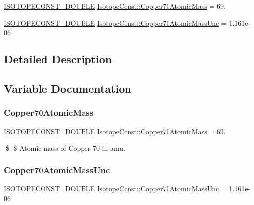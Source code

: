 \begin{DoxyCompactItemize}
\item 
\mbox{\hyperlink{group___isotope_const-_macros_ga8f45a7272ce02c0b4c65c44636ed719a}{I\+S\+O\+T\+O\+P\+E\+C\+O\+N\+S\+T\+\_\+\+D\+O\+U\+B\+LE}} \mbox{\hyperlink{group___isotope_const-_copper-_cu70_ga4dbd45afa2504af0aa63e2fa0423e0e4}{Isotope\+Const\+::\+Copper70\+Atomic\+Mass}} = 69.
\item 
\mbox{\hyperlink{group___isotope_const-_macros_ga8f45a7272ce02c0b4c65c44636ed719a}{I\+S\+O\+T\+O\+P\+E\+C\+O\+N\+S\+T\+\_\+\+D\+O\+U\+B\+LE}} \mbox{\hyperlink{group___isotope_const-_copper-_cu70_gaf562cc7680d7601bb07f87e8ff3b6524}{Isotope\+Const\+::\+Copper70\+Atomic\+Mass\+Unc}} = 1.\+161e-\/06
\end{DoxyCompactItemize}


\subsection{Detailed Description}


\subsection{Variable Documentation}
\mbox{\label{group___isotope_const-_copper-_cu70_ga4dbd45afa2504af0aa63e2fa0423e0e4}} 
\subsubsection{\texorpdfstring{Copper70\+Atomic\+Mass}{Copper70AtomicMass}}
{\footnotesize\ttfamily \mbox{\hyperlink{group___isotope_const-_macros_ga8f45a7272ce02c0b4c65c44636ed719a}{I\+S\+O\+T\+O\+P\+E\+C\+O\+N\+S\+T\+\_\+\+D\+O\+U\+B\+LE}} Isotope\+Const\+::\+Copper70\+Atomic\+Mass = 69.}

\$ \$ Atomic mass of Copper-\/70 in amu. \mbox{\label{group___isotope_const-_copper-_cu70_gaf562cc7680d7601bb07f87e8ff3b6524}} 
\subsubsection{\texorpdfstring{Copper70\+Atomic\+Mass\+Unc}{Copper70AtomicMassUnc}}
{\footnotesize\ttfamily \mbox{\hyperlink{group___isotope_const-_macros_ga8f45a7272ce02c0b4c65c44636ed719a}{I\+S\+O\+T\+O\+P\+E\+C\+O\+N\+S\+T\+\_\+\+D\+O\+U\+B\+LE}} Isotope\+Const\+::\+Copper70\+Atomic\+Mass\+Unc = 1.\+161e-\/06}

